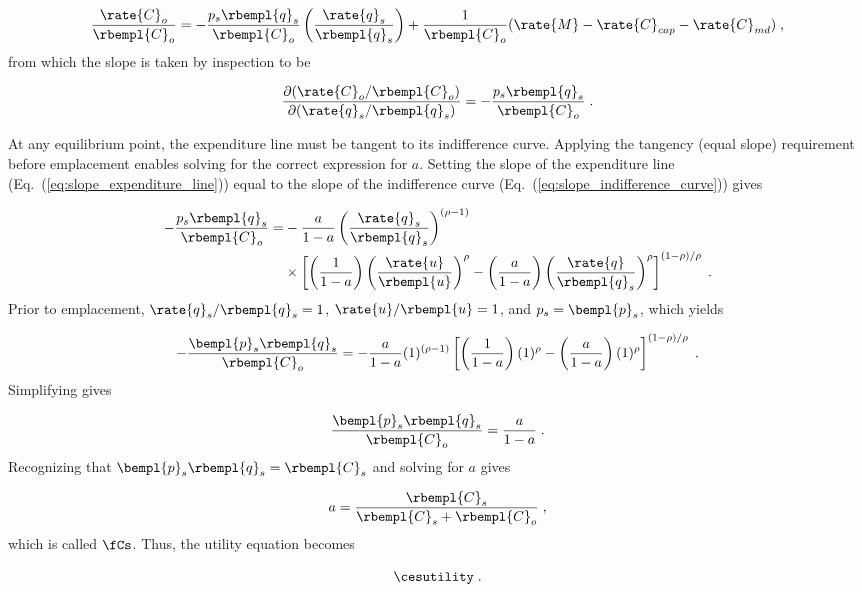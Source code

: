 \begin{equation}
  \frac{\rate{C}_o}{\rbempl{C}_o} = - \frac{p_s \rbempl{q}_s}{\rbempl{C}_o}  
                                        \left( \frac{\rate{q}_s}{\rbempl{q}_s}   \right)
                                    + \frac{1}{\rbempl{C}_o}
                                          (\rate{M} - \rate{C}_{cap} - \rate{C}_{md}) \; ,
\end{equation}
%
from which the slope is taken by inspection to be

\begin{equation} \label{eq:slope_expenditure_line}
  \frac{\partial (\rate{C}_o/\rbempl{C}_o)}{\partial (\rate{q}_s/\rbempl{q}_s)} =
              - \frac{p_s \rbempl{q}_s}{\rbempl{C}_o} \; .
\end{equation}

At any equilibrium point, the expenditure line must be tangent to its indifference curve.
Applying the tangency (equal slope) requirement before emplacement enables 
solving for the correct expression for $a$.
Setting the slope of the expenditure line (Eq.~(\ref{eq:slope_expenditure_line}))
equal to the slope of the indifference curve (Eq.~(\ref{eq:slope_indifference_curve})) gives

\begin{align}
  - \frac{p_s \rbempl{q}_s}{\rbempl{C}_o} =& 
        -\frac{a}{1 - a} \left( \frac{\rate{q}_s}{\rbempl{q}_s} \right)^{(\rho -1)} \nonumber \\
        &\times \left[ \left( \frac{1}{1 - a} \right) \left( \frac{\rate{u}}{\rbempl{u}} \right)^\rho
                - \left( \frac{a}{1 - a} \right) 
                          \left( \frac{\rate{q}}{\rbempl{q}_s} \right)^\rho \right]^{(1 - \rho)/\rho} \; .
\end{align}
%
Prior to emplacement, $\rate{q}_s/\rbempl{q}_s = 1$, $\rate{u}/\rbempl{u} = 1$, and
$p_s = \bempl{p}_s$, which yields

\begin{equation}
  - \frac{\bempl{p}_s \rbempl{q}_s}{\rbempl{C}_o} =
        -\frac{a}{1 - a} (1)^{(\rho -1)}
        \left[ \left( \frac{1}{1 - a} \right) (1)^\rho
                - \left( \frac{a}{1 - a} \right) 
                          (1)^\rho \right]^{(1 - \rho)/\rho} \; .
\end{equation}
%
Simplifying gives

\begin{equation}
  \frac{\bempl{p}_s \rbempl{q}_s}{\rbempl{C}_o} = \frac{a}{1 - a} \; .
\end{equation}
%
Recognizing that $\bempl{p}_s \rbempl{q}_s = \rbempl{C}_s$ and solving for
$a$ gives

\begin{equation}
  a = \frac{\rbempl{C}_s}{\rbempl{C}_s + \rbempl{C}_o} \; ,
\end{equation}
%
which is called $\fCs$.
Thus, the utility equation becomes

\begin{equation} \label{eq:ces_utility}
  \cesutility \; .
\end{equation}
%


